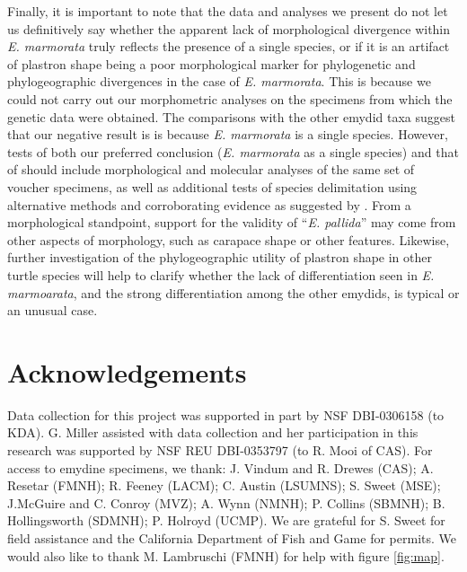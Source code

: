 \documentclass[fleqn,10pt,lineno]{wlpeerj} %
\begin{document}
Finally, it is important to note that the data and analyses we present do not let us definitively say whether the apparent lack of morphological divergence within \textit{E. marmorata} truly reflects the presence of a single species, or if it is an artifact of plastron shape being a poor morphological marker for phylogenetic and phylogeographic divergences in the case of \textit{E. marmorata}. This is because we could not carry out our morphometric analyses on the specimens from which the genetic data were obtained. The comparisons with the other emydid taxa suggest that our negative result is is because \textit{E. marmorata} is a single species. However, tests of both our preferred conclusion (\textit{E. marmorata} as a single species) and that of \citet{Spinks2014} should include morphological and molecular analyses of the same set of voucher specimens, as well as additional tests of species delimitation using alternative methods and corroborating evidence as suggested by \citet{Carstens2013}. From a morphological standpoint, support for the validity of ``\textit{E. pallida}'' may come from other aspects of morphology, such as carapace shape or other features. Likewise, further investigation of the phylogeographic utility of plastron shape in other turtle species will help to clarify whether the lack of differentiation seen in \textit{E. marmoarata}, and the strong differentiation among the other emydids, is typical or an unusual case.


\section*{Acknowledgements}
Data collection for this project was supported in part by NSF DBI-0306158 (to KDA). G. Miller assisted with data collection and her participation in this research was supported by NSF REU DBI-0353797 (to R. Mooi of CAS). For access to emydine specimens, we thank: J. Vindum and R. Drewes (CAS); A. Resetar (FMNH); R. Feeney (LACM); C. Austin (LSUMNS); S. Sweet (MSE); J.McGuire and C. Conroy (MVZ); A. Wynn (NMNH); P. Collins (SBMNH); B. Hollingsworth (SDMNH); P. Holroyd (UCMP). We are grateful for S. Sweet for field assistance and the California Department of Fish and Game for permits. We would also like to thank M. Lambruschi (FMNH) for help with figure \ref{fig:map}.




\end{document}
